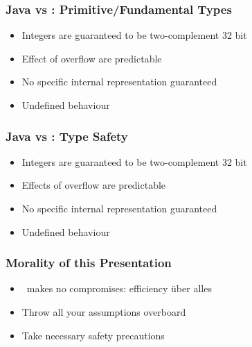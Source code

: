 \begin{frame}
  \frametitle{Java vs \cpp: Primitive/Fundamental Types}
  \begin{itemize}
    \item Integers are guaranteed to be two-complement 32 bit
    \item Effect of overflow are predictable
  \end{itemize}
  \vskip2mm
  \structure{\cpp}
  \begin{itemize}
    \item No specific internal representation guaranteed 
    \item Undefined behaviour
  \end{itemize}
\end{frame}

\begin{frame}
  \frametitle{Java vs \cpp: Type Safety}
  \begin{itemize}
    \item Integers are guaranteed to be two-complement 32 bit
    \item Effects of overflow are predictable
  \end{itemize}
  \vskip2mm
  \structure{\cpp}
  \begin{itemize}
    \item No specific internal representation guaranteed 
    \item Undefined behaviour
  \end{itemize}
\end{frame}

\begin{frame}
  \frametitle{Morality of this Presentation}
  \begin{itemize}
    \item \cpp\ makes no compromises: efficiency \"uber alles
    \item Throw all your assumptions overboard
    \item Take necessary safety precautions
  \end{itemize}
\end{frame}

